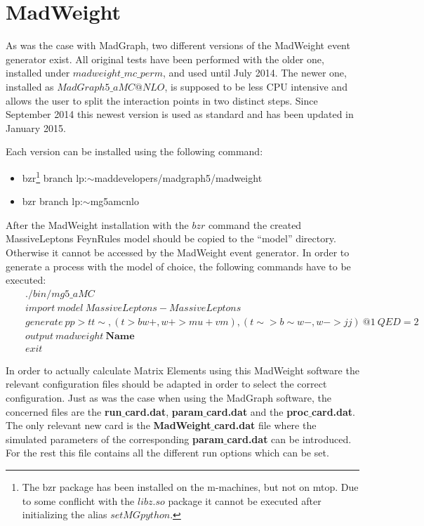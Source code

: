 \section{MadWeight}

As was the case with MadGraph, two different versions of the MadWeight event generator exist. All original tests have been performed with the older one, installed under $madweight\_mc\_perm$, and used until July 2014. The newer one, installed as $MadGraph5\_aMC@NLO$, is supposed to be less CPU intensive and allows the user to split the interaction points in two distinct steps.
Since September 2014 this newest version is used as standard and has been updated in January 2015.

Each version can be installed using the following command:
\begin{itemize}
  \item bzr\footnote{The bzr package has been installed on the m-machines, but not on mtop. Due to some conflicht with the $libz.so$ package it cannot be executed after initializing the alias $setMGpython$.} branch lp:$\sim$maddevelopers/madgraph5/madweight 
  \item bzr branch lp:$\sim$mg5amcnlo
\end{itemize}

After the MadWeight installation with the $bzr$ command the created MassiveLeptons FeynRules model should be copied to the ``model'' directory. Otherwise it cannot be accessed by the MadWeight event generator. In order to generate a process with the model of choice, the following commands have to be executed:
\begin{eqnarray}
   & & ./bin/mg5\_aMC \nonumber \\
   & & import ~ model ~ MassiveLeptons-MassiveLeptons \nonumber \\
   & & generate ~ p p > t t\sim , ( t > b w+ , w+ > mu+ vm ) , ( t\sim > b\sim w- , w- > j j ) ~ @1 ~ QED = 2 \nonumber \\
   & & output ~ madweight ~ \textbf{Name} \nonumber \\
   & & exit \nonumber
\end{eqnarray}
  
In order to actually calculate Matrix Elements using this MadWeight software the relevant configuration files should be adapted in order to select the correct configuration. Just as was the case when using the MadGraph software, the concerned files are the \textbf{run$\_$card.dat}, \textbf{param$\_$card.dat} and the \textbf{proc$\_$card.dat}.\\
The only relevant new card is the \textbf{MadWeight$\_$card.dat} file where the simulated parameters of the corresponding \textbf{param$\_$card.dat} can be introduced. For the rest this file contains all the different run options which can be set.

